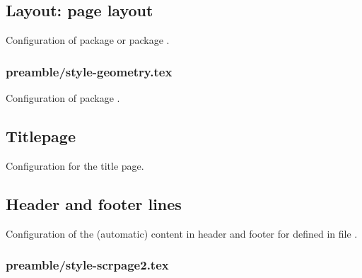 
\subsection{Layout: page layout}

Configuration of package  or package .


\subsubsection{preamble/style-geometry.tex}

Configuration of package . 


\subsection{Titlepage}

Configuration for the title page.


\subsection{Header and footer lines}

Configuration of the (automatic) content in header and footer for  defined in file .


\subsubsection{preamble/style-scrpage2.tex}

